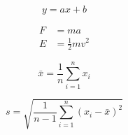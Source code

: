 
\begin{equation}
  y = ax + b
\end{equation}

\begin{align}
  F &= ma \\
  E &= \frac{1}{2}mv^2
\end{align}

\begin{equation}
  \bar{x} = \frac{1}{n}\sum_{i=1}^{n} x_i
\end{equation}

\begin{equation}
  s = \sqrt{\frac{1}{n-1}\sum_{i=1}^{n}(x_i - \bar{x})^2}
\end{equation}
